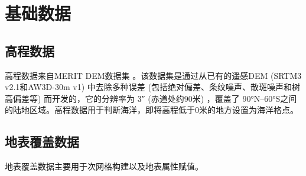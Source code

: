 \chapter{基础数据}\label{基础数据}


\section{高程数据}
高程数据来自MERIT DEM数据集 \citep{yamazaki2017high}。该数据集是通过从已有的遥感DEM (SRTM3 v2.1和AW3D-30m v1) 中去除多种误差 (包括绝对偏差、条纹噪声、散斑噪声和树高偏差等) 而开发的，它的分辨率为 \ang{;;3} (赤道处约90米) ，覆盖了 \ang{90;;}N--\ang{60;;}S之间的陆地区域。高程数据用于判断海洋，即将高程低于0米的地方设置为海洋格点。

\section{地表覆盖数据}\label{地表覆盖数据}
地表覆盖数据主要用于次网格构建以及地表属性赋值。
